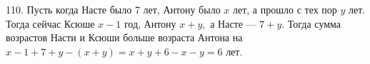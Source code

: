 110. Пусть когда Насте было 7 лет, Антону было $x$ лет, а прошло с тех пор $y$ лет. Тогда сейчас Ксюше $x-1$ год, Антону $x+y,$ а Насте --- $7+y.$ Тогда сумма возрастов Насти и Ксюши больше возраста Антона на $x-1+7+y-(x+y)=x+y+6-x-y=6$ лет.\\
